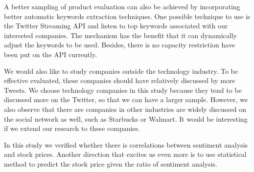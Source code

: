 \documentclass[12pt]{article}
\begin{document}
A better sampling of product evaluation can also be achieved by incorporating better automatic keywords extraction techniques. One possible technique to use is the Twitter Streaming API \cite{TwtStrAPI} and listen to top keywords associated with our interested companies. The mechanism has the benefit that it can dynamically adjust the keywords to be used. Besides, there is no capacity restriction have been put on the API currently.

We would also like to study companies outside the technology industry. To be effective evaluated, these companies should have relatively discussed by more Tweets. We choose technology companies in this study because they tend to be discussed more on the Twitter, so that we can have a larger sample. However, we also observe that there are companies in other industries are widely discussed on the social network as well, such as Starbucks or Walmart. It would be interesting if we extend our research to these companies.

In this study we verified whether there is correlations between sentiment analysis and stock prices. Another direction that excites us even more is to use statistical method to predict the stock price given the ratio of sentiment analysis.



\end{document}
